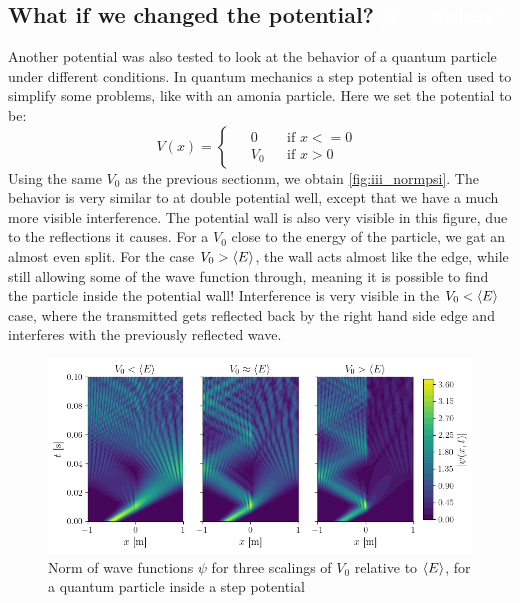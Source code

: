 \subsection{What if we changed the potential? \textcolor{white}{jk... unless?}}

Another potential was also tested to look at the behavior of a quantum particle under different conditions. In quantum mechanics a step potential is often used to simplify some problems, like with an amonia particle. Here we set the potential to be:
\begin{equation}
    V(x) = \begin{cases}
        \begin{aligned}
            &0 &&\textrm{if } x <= 0 \\
            &V_0 &&\textrm{if } x > 0
        \end{aligned}
    \end{cases}
\end{equation}
Using the same \(V_0\) as the previous sectionm, we obtain \autoref{fig:iii_normpsi}. The behavior is very similar to at double potential well, except that we have a much more visible interference. The potential wall is also very visible in this figure, due to the reflections it causes. For a \(V_0\) close to the energy of the particle, we gat an almost even split. For the case \(V_0 > \langle E \rangle\), the wall acts almost like the edge, while still allowing some of the wave function through, meaning it is possible to find the particle inside the potential wall! Interference is very visible in the \(V_0 < \langle E \rangle\) case, where the transmitted gets reflected back by the right hand side edge and interferes with the previously reflected wave.

\begin{figure}[h]
    \centering
    \includegraphics[width=\linewidth]{figures/iii_normpsi.png}
    \caption{Norm of wave functions $\psi$ for three scalings of $V_0$ relative to $\langle E \rangle$, for a quantum particle inside a step potential}
    \label{fig:iii_normpsi}
\end{figure}

